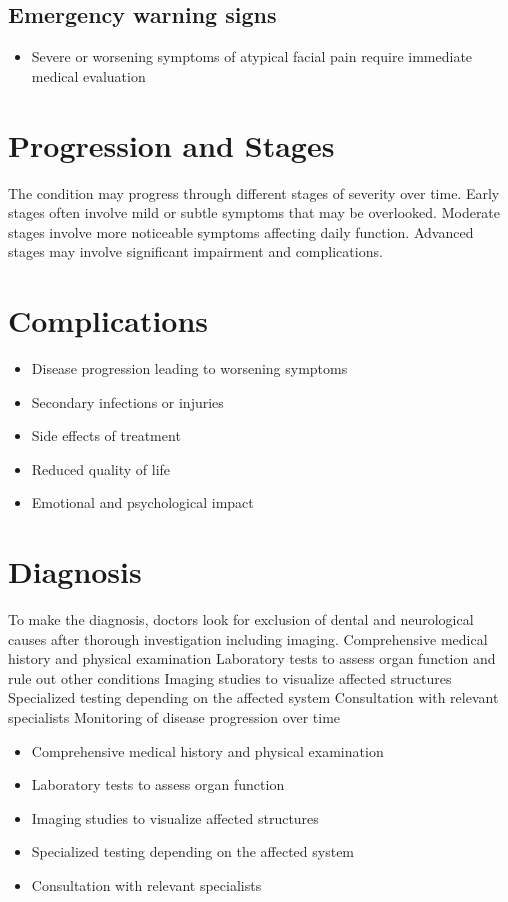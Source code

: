 \subsection{Emergency warning signs}
\begin{itemize}[noitemsep]
  \item Severe or worsening symptoms of atypical facial pain require immediate medical evaluation
\end{itemize}
\section{Progression and Stages}
The condition may progress through different stages of severity over time. Early stages often involve mild or subtle symptoms that may be overlooked. Moderate stages involve more noticeable symptoms affecting daily function. Advanced stages may involve significant impairment and complications.
\section{Complications}
\begin{itemize}[noitemsep]
  \item Disease progression leading to worsening symptoms
  \item Secondary infections or injuries
  \item Side effects of treatment
  \item Reduced quality of life
  \item Emotional and psychological impact
\end{itemize}
\section{Diagnosis}
To make the diagnosis, doctors look for exclusion of dental and neurological causes after thorough investigation including imaging. Comprehensive medical history and physical examination Laboratory tests to assess organ function and rule out other conditions Imaging studies to visualize affected structures Specialized testing depending on the affected system Consultation with relevant specialists Monitoring of disease progression over time

\begin{itemize}[noitemsep]
  \item Comprehensive medical history and physical examination
  \item Laboratory tests to assess organ function
  \item Imaging studies to visualize affected structures
  \item Specialized testing depending on the affected system
  \item Consultation with relevant specialists
\end{itemize}
